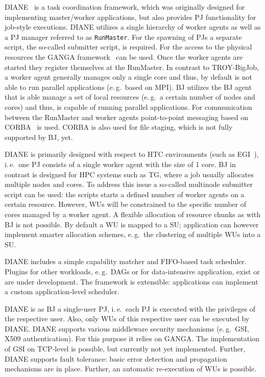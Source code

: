 \documentclass[conference,final]{IEEEtran}
\begin{document}
DIANE~\cite{Moscicki:908910} is a task coordination framework, which was
originally designed for implementing master/worker applications, but also
provides PJ functionality for job-style executions. DIANE utilizes a single
hierarchy of worker agents as well as a PJ manager referred to as
\texttt{RunMaster}.
For the spawning of PJs a separate script, the so-called submitter script, is
required. For the access to the physical resources the GANGA
framework~\cite{DBLP:journals/corr/abs-0902-2685} can be used.
Once the worker agents are started they register themselves at the RunMaster.
In contrast to TROY-BigJob, a worker agent generally manages only a single
core and thus, by default is not able to run parallel applications (e.\,g.\
based on MPI). BJ utilizes the BJ agent that is able manage a set of local
resources (e.\,g.\ a certain number of nodes and cores) and thus, is capable
of running parallel applications. For communication between the RunMaster and
worker agents point-to-point messaging based on CORBA~\cite{OMG-CORBA303:2004}
is used. CORBA is also used for file staging, which is not fully supported by
BJ, yet.

DIANE is primarily designed with respect to HTC environments (such as
EGI~\cite{egi}), i.\,e.\ one PJ consists of a single worker agent with the
size of 1 core. BJ in contrast is designed for HPC systems such as TG,
where a job usually allocates multiple nodes and cores. To address this issue
a so-called multinode submitter script can be used: the scripts starts a
defined number of worker agents on a certain resource. However, WUs will be
constrained to the specific number of cores managed by a worker agent. A
flexible allocation of resource chunks as with BJ is not possible. By
default a WU is mapped to a SU; application can however implement smarter
allocation schemes, e.\,g.\ the clustering of multiple WUs into a SU.

DIANE includes a simple capability matcher and FIFO-based task scheduler.
Plugins for other workloads, e.\,g.\ DAGs or for data-intensive
application, exist or are under development. The framework is extensible:
applications can implement a custom application-level scheduler.


DIANE is as BJ a single-user PJ, i.\,e.\ each PJ is executed with the
privileges of the respective user. Also, only WUs of this respective user can be
executed by DIANE. DIANE supports various middleware security mechanisms
(e.\,g.\ GSI, X509 authentication). For this purpose it relies on GANGA. The
implementation of GSI on TCP-level is possible, but currently not yet
implemented. Further, DIANE supports fault tolerance: basic error detection and
propagation mechanisms are in place. Further, an automatic re-execution of WUs
is possible.
\end{document}
